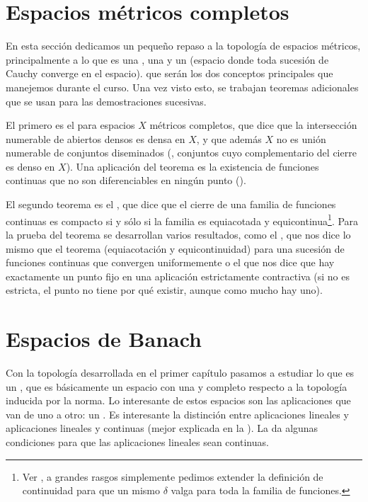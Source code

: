 \section{Espacios métricos completos}

En esta sección dedicamos un pequeño repaso a la topología de espacios métricos, principalmente a lo que es una , una  y un  (espacio donde toda sucesión de Cauchy converge en el espacio). que serán los dos conceptos principales que manejemos durante el curso. Una vez visto esto, se trabajan teoremas adicionales que se usan para las demostraciones sucesivas.

El primero es el  para espacios $X$ métricos completos, que dice que la intersección numerable de abiertos densos es densa en $X$, y que además $X$ no es unión numerable de conjuntos diseminados (, conjuntos cuyo complementario del cierre es denso en $X$). Una aplicación del teorema es la existencia de funciones continuas que no son diferenciables en ningún punto ().

El segundo teorema es el , que dice que el cierre de una familia de funciones continuas es compacto si y sólo si la familia es equiacotada y equicontinua\footnote{Ver , a grandes rasgos simplemente pedimos extender la definición de continuidad para que un mismo $δ$ valga para toda la familia de funciones.}. Para la prueba del teorema se desarrollan varios resultados, como el , que nos dice lo mismo que el teorema (equiacotación y equicontinuidad) para una sucesión de funciones continuas que convergen uniformemente o el  que nos dice que hay exactamente un punto fijo en una aplicación estrictamente contractiva (si no es estricta, el punto no tiene por qué existir, aunque como mucho hay uno).

\section{Espacios de Banach}

Con la topología desarrollada en el primer capítulo pasamos a estudiar lo que es un , que es básicamente un espacio con una  y completo respecto a la topología inducida por la norma. Lo interesante de estos espacios son las aplicaciones que van de uno a otro: un . Es interesante la distinción entre aplicaciones lineales y aplicaciones lineales y continuas (mejor explicada en la ). La  da algunas condiciones para que las aplicaciones lineales sean continuas.

